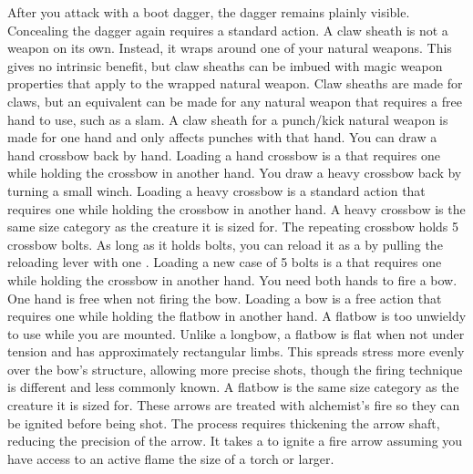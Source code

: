         After you attack with a boot dagger, the dagger remains plainly visible.
        Concealing the dagger again requires a standard action.
         A claw sheath is not a weapon on its own.
        Instead, it wraps around one of your natural weapons.
        This gives no intrinsic benefit, but claw sheaths can be imbued with magic weapon properties that apply to the wrapped natural weapon.
        Claw sheaths are made for claws, but an equivalent can be made for any natural weapon that requires a free hand to use, such as a slam.
        A claw sheath for a punch/kick natural weapon is made for one hand and only affects punches with that hand.
         You can draw a hand crossbow back by hand. Loading a hand crossbow is a  that requires one  while holding the crossbow in another hand.
         You draw a heavy crossbow back by turning a small winch.
        Loading a heavy crossbow is a standard action that requires one  while holding the crossbow in another hand.
        A heavy crossbow is the same size category as the creature it is sized for.
         The repeating crossbow holds 5 crossbow bolts. As long as it holds bolts, you can reload it as a  by pulling the reloading lever with one . Loading a new case of 5 bolts is a  that requires one  while holding the crossbow in another hand.
         You need both hands to fire a bow. One hand is free when not firing the bow. Loading a bow is a free action that requires one  while holding the flatbow in another hand. A flatbow is too unwieldy to use while you are mounted.
        Unlike a longbow, a flatbow is flat when not under tension and has approximately rectangular limbs.
        This spreads stress more evenly over the bow's structure, allowing more precise shots, though the firing technique is different and less commonly known.
        A flatbow is the same size category as the creature it is sized for.
         These arrows are treated with alchemist's fire so they can be ignited before being shot.
        The process requires thickening the arrow shaft, reducing the precision of the arrow.
        It takes a  to ignite a fire arrow assuming you have access to an active flame the size of a torch or larger.
